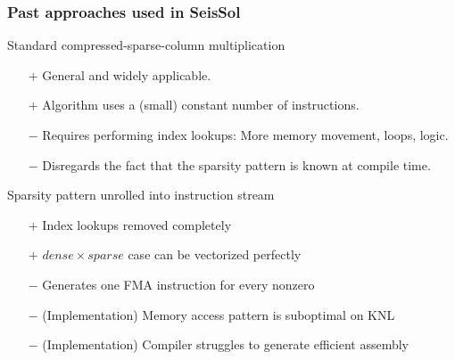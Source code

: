 \documentclass[9pt]{beamer}
\begin{document}
\begin{frame}
  \frametitle{Past approaches used in SeisSol}
  \begin{block}{Standard compressed-sparse-column multiplication}
    \begin{itemize}
      \item[$+$] General and widely applicable.
      \item[$+$] Algorithm uses a (small) constant number of instructions.
      \item[$-$] Requires performing index lookups: More memory movement, loops, logic.
      \item[$-$] Disregards the fact that the sparsity pattern is known at compile time.
    \end{itemize}
  \end{block}

  \begin{block}{Sparsity pattern unrolled into instruction stream}
    \begin{itemize}
    \item[$+$] Index lookups removed completely
    \item[$+$] $dense \times sparse$ case can be vectorized perfectly 
    \item[$-$] Generates one FMA instruction for every nonzero
    \item[$-$] (Implementation) Memory access pattern is suboptimal on KNL
    \item[$-$] (Implementation) Compiler struggles to generate efficient assembly
    \end{itemize}
  \end{block}
\end{frame}
\end{document}
